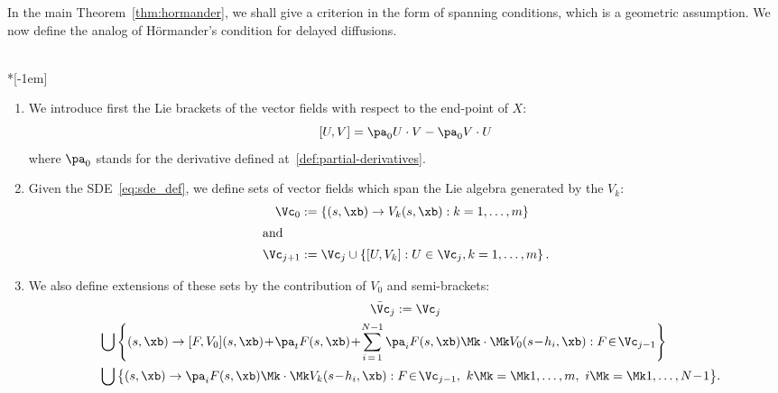 
In the main Theorem~\ref{thm:hormander}, we shall give a criterion in the form of spanning conditions, which is a geometric assumption. We now define the analog of H\"ormander's condition for delayed diffusions.

\begin{defi}\label{hormander-spaces}\ \\*[-1em]
\begin{enumerate}
\item \label{1.2.1} We introduce first the Lie brackets of the vector fields with respect to the end-point of $X$:
\begin{equation}\label{dupire-bracket}
[U,V] =\pa_0 U \cdot V-\pa_0 V \cdot U
\end{equation}
where $\pa_0$ stands for the derivative defined at~\eqref{def:partial-derivatives}.

\item \label{1.2.2} Given the SDE~\eqref{eq:sde_def}, we define sets of vector fields which span the Lie algebra generated by the $V_k$:
\begin{align*}
\Vc_0 &:= \left\{(s,\xb)\to V_k(s,\xb): k=1,\dots, m \right\}\\
\intertext{and}
\Vc_{j+1} &:= \Vc_j \cup \left\{[U,V_k]: U \in \Vc_j, k=1,\dots, m \right\}.
\end{align*}
\item \label{1.2.3} We also define extensions of these sets by the contribution of $V_0$ and semi-brackets:
\begin{multline*}
\bar \Vc_j := \Vc_j \\
\begin{aligned}
& \bigcup\left\{(s,\xb)\to[F,V_0](s,\xb)\!+\!\pa_t F(s,\xb) \!+\!\sum_{i\,=\,1}^{N-1} \pa_i F(s,\xb) \Mk\cdot\Mk V_0(s\!-\!h_i,\xb):F\!\in\! \Vc_{j-1} \right\} \\
& \bigcup\big\{(s,\xb)\to\pa_i F(s,\xb) \Mk\cdot\Mk V_k(s\!-\!h_i,\xb): F\!\in\!\Vc_{j-1},\ k\Mk=\Mk1,\dots, m,\ i\Mk=\Mk1,\dots, N\!-\!1 \big\}.
\end{aligned}\!\!\!\!
\end{multline*}
\end{enumerate}
\end{defi}

